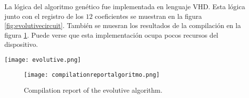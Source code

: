 La lógica del algoritmo genético fue implementada en lenguaje VHD.
Esta lógica junto con el registro de los $12$ coeficientes se muestran en la figura \ref{fig:evolutivecircuit}.
También se muesran los resultados de la compilación en la figura \ref{fig:alg_comp}.
Puede verse que esta implementación ocupa pocos recursos del dispositivo.

\begin{figure*}
	\centering
	\texttt{[image: evolutive.png]}\\
	\caption{Circuit of the evolutive algorithm.}\label{fig:evolutivecircuit}
\end{figure*}

\begin{figure}
	\centering
	\texttt{[image: compilationreportalgoritmo.png]}\\
	\caption{Compilation report of the evolutive algorithm.}\label{fig:alg_comp}
\end{figure}